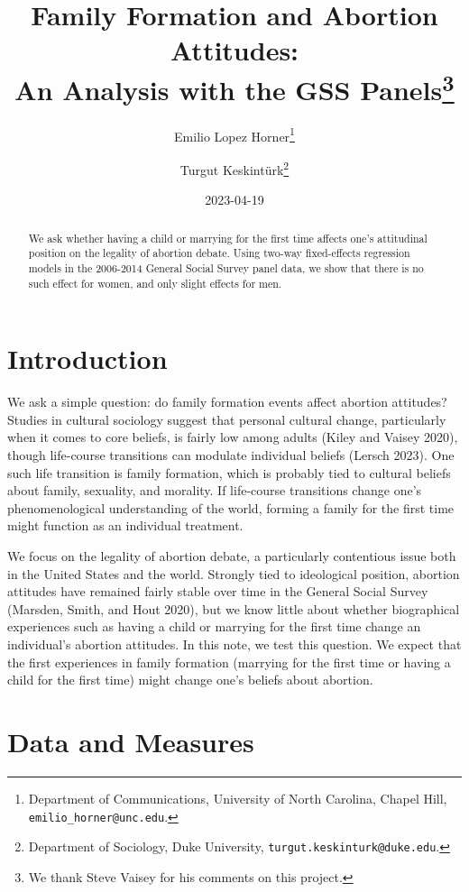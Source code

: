 \documentclass[
]{article}
\title{Family Formation and Abortion Attitudes:\\
An Analysis with the GSS Panels\footnote{We thank Steve Vaisey for his comments on this project.}}
\author{Emilio Lopez Horner\footnote{Department of Communications, University of North Carolina, Chapel Hill, \texttt{emilio\_horner@unc.edu}.} \and Turgut Keskintürk\footnote{Department of Sociology, Duke University, \texttt{turgut.keskinturk@duke.edu}.}}
\date{2023-04-19}
\begin{document}
\maketitle
\begin{abstract}
We ask whether having a child or marrying for the first time affects one's attitudinal position on the legality of abortion debate. Using two-way fixed-effects regression models in the 2006-2014 General Social Survey panel data, we show that there is no such effect for women, and only slight effects for men.
\end{abstract}

\hypertarget{introduction}{%
\section{Introduction}\label{introduction}}

We ask a simple question: do family formation events affect abortion attitudes? Studies in cultural sociology suggest that personal cultural change, particularly when it comes to core beliefs, is fairly low among adults (Kiley and Vaisey 2020), though life-course transitions can modulate individual beliefs (Lersch 2023). One such life transition is family formation, which is probably tied to cultural beliefs about family, sexuality, and morality. If life-course transitions change one's phenomenological understanding of the world, forming a family for the first time might function as an individual treatment.

We focus on the legality of abortion debate, a particularly contentious issue both in the United States and the world. Strongly tied to ideological position, abortion attitudes have remained fairly stable over time in the General Social Survey (Marsden, Smith, and Hout 2020), but we know little about whether biographical experiences such as having a child or marrying for the first time change an individual's abortion attitudes. In this note, we test this question. We expect that the first experiences in family formation (marrying for the first time or having a child for the first time) might change one's beliefs about abortion.

\hypertarget{data-and-measures}{%
\section{Data and Measures}\label{data-and-measures}}
\end{document}
